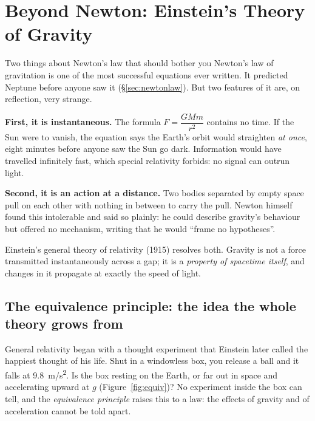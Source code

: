 \section{Beyond Newton: Einstein's Theory of Gravity}\label{sec:beyondnewton}


\begin{motivbox}{Two things about Newton's law that should bother you}
Newton's law of gravitation is one of the most successful equations ever written. It predicted Neptune
before anyone saw it (\S\ref{sec:newtonlaw}). But two features of it are, on reflection, very strange.

\smallskip
\textbf{First, it is instantaneous.} The formula $F=\dfrac{GMm}{r^{2}}$ contains no time. If the Sun
were to vanish, the equation says the Earth's orbit would straighten \emph{at once}, eight minutes
before anyone saw the Sun go dark. Information would have travelled infinitely fast, which special
relativity forbids: no signal can outrun light.

\smallskip
\textbf{Second, it is an action at a distance.} Two bodies separated by empty space pull on each other
with nothing in between to carry the pull. Newton himself found this intolerable and said so plainly:
he could describe gravity's behaviour but offered no mechanism, writing that he would ``frame no
hypotheses''.

\smallskip
Einstein's general theory of relativity (1915) resolves both. Gravity is not a force transmitted
instantaneously across a gap; it is a \emph{property of spacetime itself}, and changes in it propagate
at exactly the speed of light.
\end{motivbox}

\subsection{The equivalence principle: the idea the whole theory grows from}

General relativity began with a thought experiment that Einstein later called the happiest thought of his
life. Shut in a windowless box, you release a ball and it falls at \SI{9.8}{m/s^2}. Is the box resting on
the Earth, or far out in space and accelerating upward at $g$ (Figure~\ref{fig:equiv})? No experiment inside
the box can tell, and the \emph{equivalence principle} raises this to a law: the effects of gravity and of
acceleration cannot be told apart.

